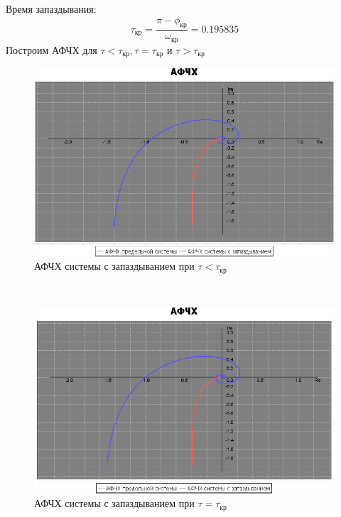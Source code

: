 \documentclass[12pt]{article}
\begin{document}
Время запаздывания: 
\begin{equation}
    \tau_{кр} = \frac{\pi - \phi_{кр}}{\omega_{кр}} = 0.195835
\end{equation}
Построим АФЧХ для $\tau < \tau_{кр}, \tau = \tau_{кр}$ и $\tau > \tau_{кр}$ \\
\begin{figure}[h!]
     \centering
    \includegraphics[width = \linewidth]{tau меньше tau крит.png}
    \caption{АФЧХ системы с запаздыванием при $\tau < \tau_{кр}$}
\end{figure} \\
\newpage
\begin{figure}[h!]
     \centering
    \includegraphics[width = \linewidth]{tau равно tau крит.png}
    \caption{АФЧХ системы с запаздыванием при $\tau = \tau_{кр}$}
\end{figure} 
\end{document}
